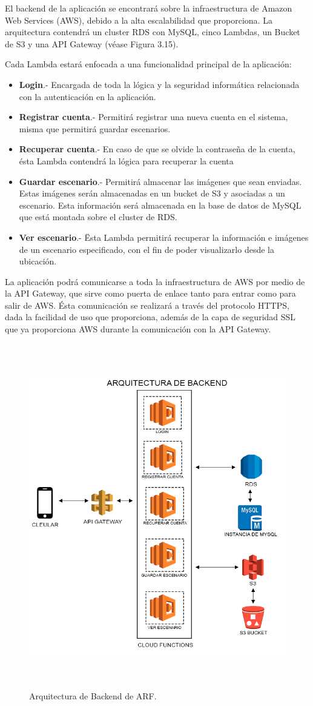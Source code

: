 El backend de la aplicación se encontrará sobre la infraestructura de Amazon Web Services (AWS), debido a la alta escalabilidad que proporciona. La arquitectura contendrá un cluster RDS con MySQL, cinco Lambdas, un Bucket de S3 y una API Gateway (véase Figura 3.15).\par
Cada Lambda estará enfocada a una funcionalidad principal de la aplicación:\par
\begin{itemize}
	\item\textbf{Login}.- Encargada de toda la lógica y la seguridad informática relacionada con la autenticación en la aplicación.
	\item\textbf{Registrar cuenta}.- Permitirá registrar una nueva cuenta en el sistema, misma que permitirá guardar escenarios.
	\item\textbf{Recuperar cuenta}.- En caso de que se olvide la contraseña de la cuenta, ésta Lambda contendrá la lógica para recuperar la cuenta
	\item\textbf{Guardar escenario}.- Permitirá almacenar las imágenes que sean enviadas. Estas imágenes serán almacenadas en un bucket de S3 y asociadas a un escenario. Esta información será almacenada en la base de datos de MySQL que está montada sobre el cluster de RDS.
	\item\textbf{Ver escenario}.- Ësta Lambda permitirá recuperar la información e imágenes de un escenario especificado, con el fin de poder visualizarlo desde la ubicación.
\end{itemize}
\noindent
La aplicación podrá comunicarse a toda la infraestructura de AWS por medio de la API Gateway, que sirve como puerta de enlace tanto para entrar como para salir de AWS. Ésta comunicación se realizará a través del protocolo HTTPS, dada la facilidad de uso que proporciona, además de la capa de seguridad SSL que ya proporciona AWS durante la comunicación con la API Gateway.
\begin{figure}[h!]
	\centering
	\includegraphics[width=15cm,height=15cm]{imagenes/desarrollo/arquitectura/ArchitecturaBackend.png}
	\caption{Arquitectura de Backend de ARF.}
	\label{fig:arqbackend}
\end{figure}


